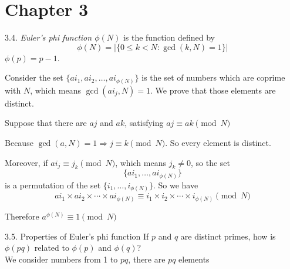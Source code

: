 \section*{Chapter 3}

3.4. \textit{Euler's phi function $\phi(N)$} is the function defined by \[\phi(N) = | \{0 \leq k < N: \gcd(k, N)=1\} |\] $\phi(p)=p-1$.

Consider the set $\{ai_1, ai_2, \ldots, ai_{\phi(N)}\}$ is the set of numbers which are coprime with $N$, which means $\gcd(ai_j, N)=1$. We prove that those elements are distinct.

Suppose that there are $aj$ and $ak$, satisfying $aj \equiv ak \pmod{N}$

Because $\gcd(a, N)=1 \Rightarrow j \equiv k \pmod{N}$. So every element is distinct. 

Moreover, if $ai_j \equiv j_k \pmod{N}$, which means $j_k \neq 0$, so the set 
\begin{equation*}
	\{ai_1, \ldots, ai_{\phi(N)}\}
\end{equation*}
is a permutation of the set $\{i_1, \ldots, i_{\phi(N)}\}$. So we have \[ai_1 \times ai_2 \times \cdots \times ai_{\phi(N)} \equiv i_1 \times i_2 \times \cdots \times i_{\phi(N)} \pmod{N}\]

Therefore $a^{\phi(N)} \equiv 1 \pmod{N}$
	

3.5. Properties of Euler's phi function
		 If $p$ and $q$ are distinct primes, how is $\phi(pq)$ related to $\phi(p)$ and $\phi(q)$? \\ We consider numbers from 1 to $pq$, there are $pq$ elements
		 
